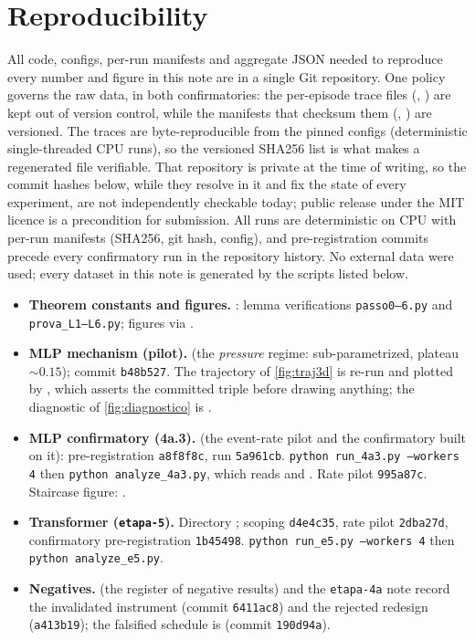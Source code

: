 \documentclass[11pt]{article}
\theoremstyle{definition}
\theoremstyle{remark}
\begin{document}
\section{Reproducibility}\label{sec:repro}

All code, configs, per-run manifests and aggregate JSON needed to reproduce
every number and figure in this note are in a single Git repository. One
policy governs the raw data, in both confirmatories: the per-episode trace
files (, ) are kept
out of version control, while the manifests that checksum them
(, ) are
versioned. The traces are byte-reproducible from the pinned configs
(deterministic single-threaded CPU runs), so the versioned SHA256 list is what
makes a regenerated file verifiable. That repository is private at the time of
writing, so the commit hashes below, while they resolve in it and fix the
state of every experiment, are not independently checkable today; public
release under the MIT licence is a precondition for submission. All runs are
deterministic on CPU with per-run manifests (SHA256, git hash, config), and
pre-registration commits precede every confirmatory run in the repository
history. No external data were used; every dataset in this note is generated
by the scripts listed below.

{\sloppy
\begin{itemize}
\item \textbf{Theorem constants and figures.} : lemma
verifications \texttt{passo0--6.py} and \texttt{prova\_L1--L6.py}; figures via
.
\item \textbf{MLP mechanism (pilot).}
 (the \emph{pressure} regime:
sub-parametrized, plateau $\sim0.15$); commit \texttt{b48b527}. The trajectory of
\cref{fig:traj3d} is re-run and plotted by
, which asserts the committed
triple before drawing anything; the diagnostic of \cref{fig:diagnostico} is
.
\item \textbf{MLP confirmatory (4a.3).}  (the
event-rate pilot and the confirmatory built on it): pre-registration
\texttt{a8f8f8c}, run \texttt{5a961cb}.
\texttt{python run\_4a3.py --workers 4} then \texttt{python analyze\_4a3.py},
which reads  and . Rate pilot
\texttt{995a87c}. Staircase figure: .
\item \textbf{Transformer (\texttt{etapa-5}).} Directory
; scoping \texttt{d4e4c35}, rate
pilot \texttt{2dba27d}, confirmatory
pre-registration \texttt{1b45498}.
\texttt{python run\_e5.py --workers 4} then \texttt{python analyze\_e5.py}.
\item \textbf{Negatives.}  (the register of
negative results) and the \texttt{etapa-4a} note record the invalidated instrument
(commit \texttt{6411ac8}) and the rejected redesign (\texttt{a413b19}); the
falsified schedule is  (commit \texttt{190d94a}).
\end{itemize}
\par}
\end{document}
